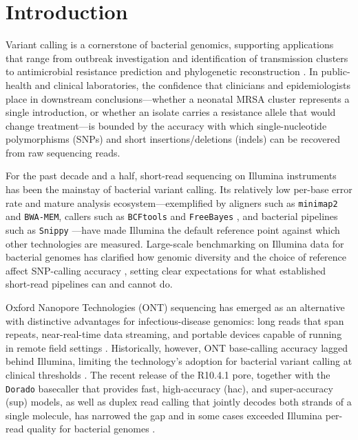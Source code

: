 \section{Introduction}

Variant calling is a cornerstone of bacterial genomics, supporting applications that range from outbreak investigation and identification of transmission clusters to antimicrobial resistance prediction and phylogenetic reconstruction \citep{didelot2012transforming,koser2012rapid,bush2020genomic}. In public-health and clinical laboratories, the confidence that clinicians and epidemiologists place in downstream conclusions---whether a neonatal MRSA cluster represents a single introduction, or whether an isolate carries a resistance allele that would change treatment---is bounded by the accuracy with which single-nucleotide polymorphisms (SNPs) and short insertions/deletions (indels) can be recovered from raw sequencing reads.

For the past decade and a half, short-read sequencing on Illumina instruments has been the mainstay of bacterial variant calling. Its relatively low per-base error rate and mature analysis ecosystem---exemplified by aligners such as \texttt{minimap2} \citep{li2018minimap2} and \texttt{BWA-MEM}, callers such as \texttt{BCFtools} \citep{danecek2021bcftools} and \texttt{FreeBayes} \citep{garrison2012freebayes}, and bacterial pipelines such as \texttt{Snippy} \citep{seemann_snippy}---have made Illumina the default reference point against which other technologies are measured. Large-scale benchmarking on Illumina data for bacterial genomes has clarified how genomic diversity and the choice of reference affect SNP-calling accuracy \citep{bush2020genomic}, setting clear expectations for what established short-read pipelines can and cannot do.

Oxford Nanopore Technologies (ONT) sequencing has emerged as an alternative with distinctive advantages for infectious-disease genomics: long reads that span repeats, near-real-time data streaming, and portable devices capable of running in remote field settings \citep{quick2016realtime,amarasinghe2020opportunities}. Historically, however, ONT base-calling accuracy lagged behind Illumina, limiting the technology's adoption for bacterial variant calling at clinical thresholds \citep{shafin2020nanopore}. The recent release of the R10.4.1 pore, together with the \texttt{Dorado} basecaller \citep{oxfordnanopore_dorado} that provides fast, high-accuracy (hac), and super-accuracy (sup) models, as well as duplex read calling that jointly decodes both strands of a single molecule, has narrowed the gap and in some cases exceeded Illumina per-read quality for bacterial genomes \citep{sereika2022oxford,wick2023perfect}.

